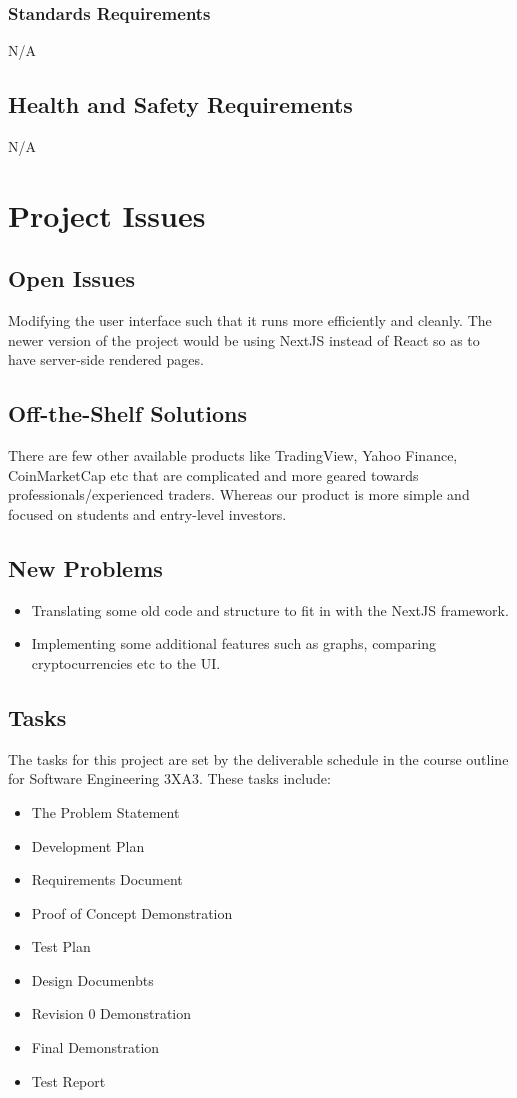 \documentclass[12pt, titlepage]{article}
\begin{document}
\subsubsection{Standards Requirements}
N/A

\subsection{Health and Safety Requirements}
N/A


\section{Project Issues}

\subsection{Open Issues}
Modifying the user interface such that it runs more efficiently and cleanly. The newer version of the project would be using NextJS instead of React so as to have server-side rendered pages. 


\subsection{Off-the-Shelf Solutions}
There are few other available products like TradingView, Yahoo Finance, CoinMarketCap etc that are complicated and more geared towards professionals/experienced traders. Whereas our product is more simple and focused on students and entry-level investors.  

\subsection{New Problems}
\begin{itemize}
    \item Translating some old code and structure to fit in with the NextJS framework.
    \item Implementing some additional features such as graphs, comparing cryptocurrencies etc to the UI. 
\end{itemize}

\subsection{Tasks}
The tasks for this project are set by the deliverable schedule in the course outline for Software Engineering 3XA3. These tasks include: 
\begin{itemize}
    \item The Problem Statement
    \item Development Plan 
    \item Requirements Document
    \item Proof of Concept Demonstration
    \item Test Plan
    \item Design Documenbts
    \item Revision 0 Demonstration 
    \item Final Demonstration 
    \item Test Report
\end{itemize}
\end{document}
